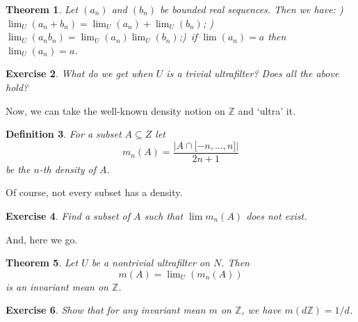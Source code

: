 \documentclass[12pt]{article}
\newtheorem{theorem}{Theorem}
\newtheorem{definition}[theorem]{Definition}
\newtheorem{exercise}[theorem]{Exercise}
\begin{document}
\begin{theorem}
Let $(a_{n})$ and $(b_{n})$ be bounded real sequences. Then we have: ) $\lim\nolimits_{U}(a_{n}+b_{n})=\lim\nolimits_{U}(a_{n})+\lim%
\nolimits_{U}(b_{n})$; ) $\lim\nolimits_{U}(a_{n}b_{n})=\lim\nolimits_{U}(a_{n})\lim%
\nolimits_{U}(b_{n})$;)\ if $\lim (a_{n})=a$ then $\lim_{U}(a_{n})=a$.
\end{theorem}

\begin{exercise}
What do we get when $U$ is a trivial ultrafilter? Does all the above hold?
\end{exercise}

Now, we can take the well-known density notion on $\mathbb{Z}$ and `ultra'
it.

\begin{definition}
For a subset $A\subseteq Z$ let 
\begin{equation*}
m_{n}(A)=\frac{\left\vert A\cap\lbrack-n,\ldots,n]\right\vert }{2n+1}
\end{equation*}
be the $n$-th density of $A$.
\end{definition}

Of course, not every subset has a density.

\begin{exercise}
Find a subset of $A$ such that $\lim m_{n}(A)$ does not exist.
\end{exercise}

And, here we go.

\begin{theorem}
Let $U$ be a nontrivial ultrafilter on $N$. Then 
\begin{equation*}
m(A)=\lim\nolimits_{U}(m_{n}(A)) 
\end{equation*}
is an invariant mean on $\mathbb{Z}$.
\end{theorem}

\begin{exercise}
Show that for any invariant mean $m$ on $\mathbb{Z}$, we have $m(d\mathbb{Z}%
)=1/d$.
\end{exercise}
\end{document}
